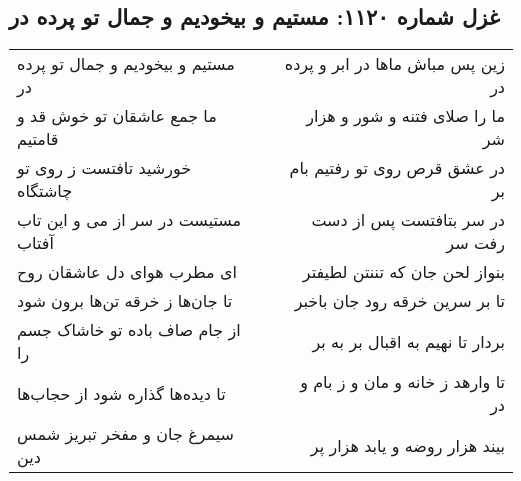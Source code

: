 \begin{center}
\section*{غزل شماره ۱۱۲۰: مستیم و بیخودیم و جمال تو پرده در}
\label{sec:1120}
\begin{longtable}{l p{0.5cm} r}
مستیم و بیخودیم و جمال تو پرده در
&&
زین پس مباش ماها در ابر و پرده در
\\
ما جمع عاشقان تو خوش قد و قامتیم
&&
ما را صلای فتنه و شور و هزار شر
\\
خورشید تافتست ز روی تو چاشتگاه
&&
در عشق قرص روی تو رفتیم بام بر
\\
مستیست در سر از می و این تاب آفتاب
&&
در سر بتافتست پس از دست رفت سر
\\
ای مطرب هوای دل عاشقان روح
&&
بنواز لحن جان که تننتن لطیفتر
\\
تا جان‌ها ز خرقه تن‌ها برون شود
&&
تا بر سرین خرقه رود جان باخبر
\\
از جام صاف باده تو خاشاک جسم را
&&
بردار تا نهیم به اقبال بر به بر
\\
تا دیده‌ها گذاره شود از حجاب‌ها
&&
تا وارهد ز خانه و مان و ز بام و در
\\
سیمرغ جان و مفخر تبریز شمس دین
&&
بیند هزار روضه و یابد هزار پر
\\
\end{longtable}
\end{center}
